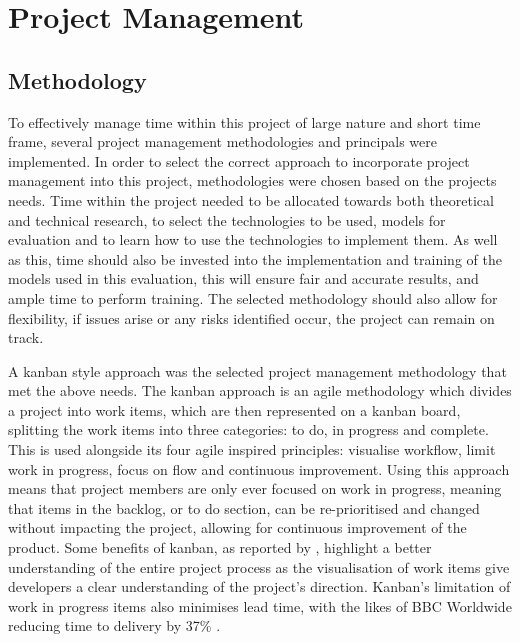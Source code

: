\section{Project Management}
\subsection{Methodology}
To effectively manage time within this project of large nature and short time frame, several project management methodologies and principals were implemented. In order to select the correct approach to incorporate project management into this project, methodologies were chosen based on the projects needs. Time within the project needed to be allocated towards both theoretical and technical research, to select the technologies to be used, models for evaluation and to learn how to use the technologies to implement them. As well as this, time should also be invested into the implementation and training of the models used in this evaluation, this will ensure fair and accurate results, and ample time to perform training. The selected methodology should also allow for flexibility, if issues arise or any risks identified occur, the project can remain on track.

A kanban style approach was the selected project management methodology that met the above needs. The kanban approach is an agile methodology which divides a project into work items, which are then represented on a kanban board, splitting the work items into three categories: to do, in progress and complete. This is used alongside its four agile inspired principles: visualise workflow, limit work in progress, focus on flow and continuous improvement. Using this approach means that project members are only ever focused on work in progress, meaning that items in the backlog, or to do section, can be re-prioritised and changed without impacting the project, allowing for continuous improvement of the product. Some benefits of kanban, as reported by \cite{ahmad2013kanban}, highlight a better understanding of the entire project process as the visualisation of work items give developers a clear understanding of the project's direction. Kanban's limitation of work in progress items also minimises lead time, with the likes of BBC Worldwide reducing time to delivery by 37\% \citep{senapathi2011factors}.

